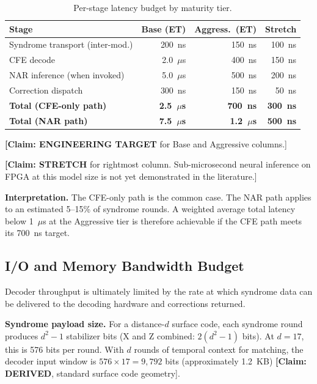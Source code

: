 \documentclass[conference]{IEEEtran}
\begin{document}
\begin{table}[H]
\centering
\caption{Per-stage latency budget by maturity tier.}
\label{tab:latency-budget}
\footnotesize
\begin{tabularx}{\columnwidth}{L{2.8cm}rrr}
\toprule
\textbf{Stage} & \textbf{Base (ET)} & \textbf{Aggress.\ (ET)} & \textbf{Stretch} \\
\midrule
Syndrome transport (inter-mod.) & 200~ns & 150~ns & 100~ns \\
CFE decode & 2.0~$\mu$s & 400~ns & 150~ns \\
NAR inference (when invoked) & 5.0~$\mu$s & 500~ns & 200~ns \\
Correction dispatch & 300~ns & 150~ns & 50~ns \\
\midrule
\textbf{Total (CFE-only path)} & \textbf{2.5~$\mu$s} & \textbf{700~ns} & \textbf{300~ns} \\
\textbf{Total (NAR path)} & \textbf{7.5~$\mu$s} & \textbf{1.2~$\mu$s} & \textbf{500~ns} \\
\bottomrule
\end{tabularx}
\end{table}

\textbf{[Claim: ENGINEERING TARGET} for Base and Aggressive columns.]

\textbf{[Claim: STRETCH} for rightmost column. Sub-microsecond neural inference on FPGA at this model size is not yet demonstrated in the literature.]

\textbf{Interpretation.} The CFE-only path is the common case. The NAR path applies to an estimated 5--15\% of syndrome rounds. A weighted average total latency below 1~$\mu$s at the Aggressive tier is therefore achievable if the CFE path meets its 700~ns target.

\subsection{I/O and Memory Bandwidth Budget}

Decoder throughput is ultimately limited by the rate at which syndrome data can be delivered to the decoding hardware and corrections returned.

\textbf{Syndrome payload size.} For a distance-$d$ surface code, each syndrome round produces $d^2 - 1$ stabilizer bits (X and Z combined: $2(d^2 - 1)$ bits). At $d = 17$, this is 576 bits per round. With $d$ rounds of temporal context for matching, the decoder input window is $576 \times 17 = 9{,}792$ bits (approximately 1.2~KB) \textbf{[Claim: DERIVED}, standard surface code geometry].
\end{document}
